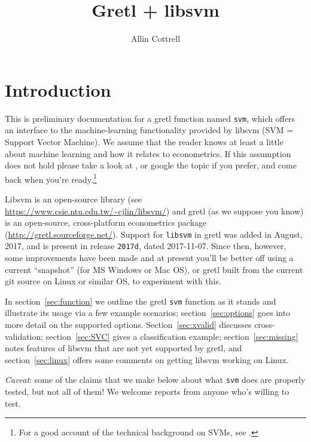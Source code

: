 \documentclass{article}
\begin{document}
\setlength{\parindent}{0pt}
\setlength{\parskip}{1ex}
\setcounter{secnumdepth}{2}

\title{Gretl + libsvm}
\author{Allin Cottrell}
\maketitle

\section{Introduction}
\label{sec:intro}

This is preliminary documentation for a gretl function named
\texttt{svm}, which offers an interface to the machine-learning
functionality provided by \textsf{libsvm} (SVM = Support Vector
Machine). We assume that the reader knows at least a little about
machine learning and how it relates to econometrics. If this
assumption does not hold please take a look at \cite{mull-spiess17},
or google the topic if you prefer, and come back when you're
ready.\footnote{For a good account of the technical background on
  SVMs, see \cite{smola04}.}

Libsvm is an open-source library (see
\url{https://www.csie.ntu.edu.tw/~cjlin/libsvm/}) and gretl (as we
suppose you know) is an open-source, cross-platform econometrics
package (\url{http://gretl.sourceforge.net/}). Support for
\texttt{libsvm} in gretl was added in August, 2017, and is present in
release \texttt{2017d}, dated 2017-11-07. Since then, however, some
improvements have been made and at present you'll be better off using
a current ``snapshot'' (for MS Windows or Mac OS), or gretl built from
the current git source on Linux or similar OS, to experiment with
this.

In section~\ref{sec:function} we outline the gretl \texttt{svm}
function as it stands and illustrate its usage via a few example
scenarios; section~\ref{sec:options} goes into more detail on the
supported options. Section~\ref{sec:xvalid} discusses
cross-validation; section~\ref{sec:SVC} gives a classification
example; section~\ref{sec:missing} notes features of \textsf{libsvm}
that are not yet supported by gretl, and section~\ref{sec:linux}
offers some comments on getting \textsf{libsvm} working on Linux.

\textit{Caveat}: some of the claims that we make below about what
\texttt{svm} does are properly tested, but not all of them! We
welcome reports from anyone who's willing to test.
\end{document}

